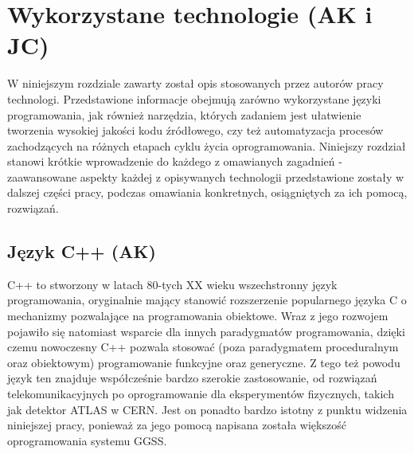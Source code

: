 \chapter{Wykorzystane technologie (AK i JC)}
\label{ch:technologies}

\graphicspath{{2_technologies/static/}}

W niniejszym rozdziale zawarty został opis stosowanych przez autorów pracy technologi. Przedstawione informacje obejmują zarówno wykorzystane języki programowania, jak również narzędzia, których zadaniem jest ułatwienie tworzenia wysokiej jakości kodu źródłowego, czy też automatyzacja procesów zachodzących na różnych etapach cyklu życia oprogramowania. Niniejszy rozdział stanowi krótkie wprowadzenie do każdego z omawianych zagadnień - zaawansowane aspekty każdej z opisywanych technologii przedstawione zostały w dalszej części pracy, podczas omawiania konkretnych, osiągniętych za ich pomocą, rozwiązań. 


\section{Język C++ (AK)}
C++ to stworzony w latach 80-tych XX wieku wszechstronny język programowania, oryginalnie mający stanowić rozszerzenie popularnego języka C o mechanizmy pozwalające na programowania obiektowe. Wraz z jego rozwojem pojawiło się natomiast wsparcie dla innych paradygmatów programowania, dzięki czemu nowoczesny C++ pozwala stosować (poza paradygmatem proceduralnym oraz obiektowym) programowanie funkcyjne oraz generyczne. Z tego też powodu język ten znajduje współcześnie bardzo szerokie zastosowanie, od rozwiązań telekomunikacyjnych po oprogramowanie dla eksperymentów fizycznych, takich jak detektor ATLAS w CERN. Jest on ponadto bardzo istotny z punktu widzenia niniejszej pracy, ponieważ za jego pomocą napisana została większość oprogramowania systemu GGSS.

